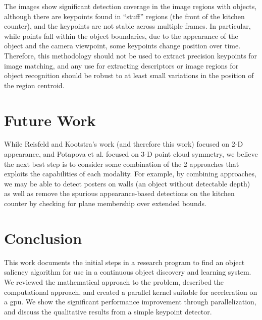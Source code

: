 The images show significant detection coverage in the image regions with objects, although there are keypoints found in ``stuff'' regions (\eg the front of the kitchen counter), and the keypoints are not stable across multiple frames. In particular, while points fall within the object boundaries, due to the appearance of the object and the camera viewpoint, some keypoints change position over time. Therefore, this methodology should not be used to extract precision keypoints for image matching, and any use for extracting descriptors or image regions for object recognition should be robust to at least small variations in the position of the region centroid.

\section{Future Work}
\label{sec:future}

While Reisfeld\cite{reisfeld_context_1995} and Kootstra's\cite{kootstra_using_2010,kootstra_fast_2010,kootstra_fast_2011,kootstra_gestalt_2011} work (and therefore this work) focused on 2-D appearance, and Potapova et al. focused on 3-D point cloud symmetry, we believe the next best step is to consider some combination of the 2 approaches that exploits the capabilities of each modality. For example, by combining approaches, we may be able to detect posters on walls (an object without detectable depth) as well as remove the spurious appearance-based detections on the kitchen counter by checking for plane membership over extended bounds. 

\section{Conclusion}
\label{sec:conclusion}

This work documents the initial steps in a research program to find an object saliency algorithm for use in a continuous object discovery and learning system. We reviewed the mathematical approach to the problem, described the computational approach, and created a parallel kernel suitable for acceleration on a \gls{gpu}. We show the significant performance improvement through parallelization, and discuss the qualitative results from a simple keypoint detector.







